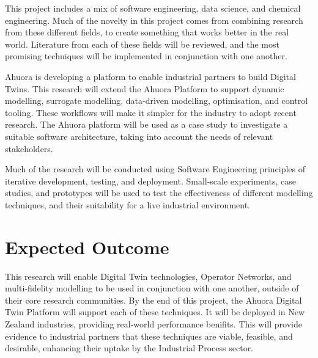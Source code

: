 \documentclass[12pt]{article}
\begin{document}
% 

This project includes a mix of software engineering, data science, and chemical engineering. Much of the novelty in this project comes from combining research from these different fields, to create something that works better in the real world. Literature from each of these fields will be reviewed, and the most promising techniques will be implemented in conjunction with one another.

Ahuora is developing a platform to enable industrial partners to build Digital Twins. This research will extend the Ahuora Platform to support dynamic modelling, surrogate modelling, data-driven modelling, optimisation, and control tooling. These workflows will make it simpler for the industry to adopt recent research. The Ahuora platform will be used as a case study to investigate a suitable software architecture, taking into account the needs of relevant stakeholders.

Much of the research will be conducted using Software Engineering principles of iterative development, testing, and deployment. Small-scale experiments, case studies, and prototypes will be used to test the effectiveness of different modelling techniques, and their suitability for a live industrial environment. 

\section*{Expected Outcome}

This research will enable Digital Twin technologies, Operator Networks, and multi-fidelity modelling to be used in conjunction with one another, outside of their core research communities.
By the end of this project, the Ahuora Digital Twin Platform will support each of these techniques. It will be deployed in New Zealand industries, providing real-world performance benifits. This will provide evidence to industrial partners that these techniques are viable, feasible, and desirable, enhancing their uptake by the Industrial Process sector.


\end{document}
